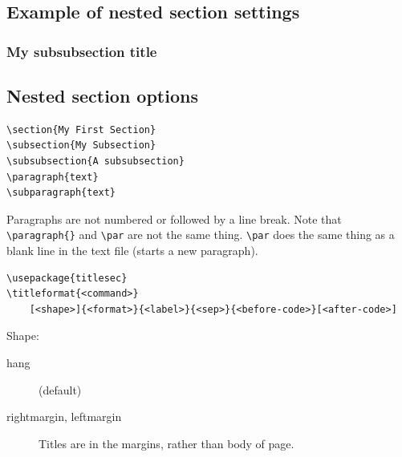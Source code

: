 \documentclass{article}
\begin{document}
\lipsum[1]
\subsection{Example of nested section settings}
\lipsum[2]
\subsubsection{My subsubsection title}
\lipsum[3]

\subsection{Nested section options}
\begin{minipage}[t]{0.5\textwidth}
\begin{lstlisting}
\section{My First Section}
\subsection{My Subsection}
\subsubsection{A subsubsection}
\paragraph{text}
\subparagraph{text}
\end{lstlisting}
\end{minipage}
\begin{minipage}[t]{0.5\textwidth}
Paragraphs are not numbered or followed by a line break.
Note that \verb|\paragraph{}| and \verb|\par| are not the same thing.
\verb|\par| does the same thing as a blank line in the text file (starts a new paragraph).
\end{minipage}

\begin{lstlisting}
\usepackage{titlesec}
\titleformat{<command>}
    [<shape>]{<format>}{<label>}{<sep>}{<before-code>}[<after-code>]
\end{lstlisting}

Shape:
\begin{description}
    \item [hang] (default)
    \item [rightmargin, leftmargin] Titles are in the margins, rather than
        body of page.
\end{description}
\end{document}
